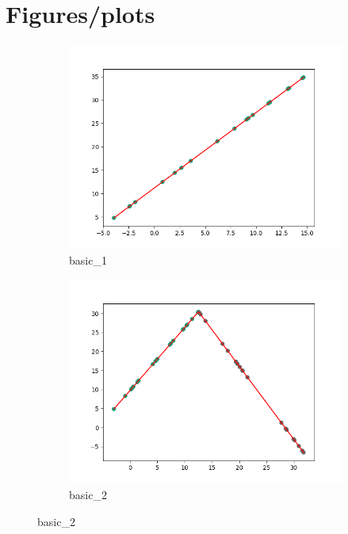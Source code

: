 \documentclass[notitlepage, 11pt]{report}
\begin{document}
		\section{Figures/plots}
		
			\begin{figure}[H]
				\centering %
				\begin{subfigure}{0.25\textwidth}
					\includegraphics[width=\linewidth]{Figure_1}
					\caption{basic\_1}
					\label{fig:1}
				\end{subfigure}\hfil %
				\begin{subfigure}{0.25\textwidth}
					\includegraphics[width=\linewidth]{Figure_2}
					\caption{basic\_2}
					\label{fig:2}

\end{subfigure}
\end{figure}
\end{document}
